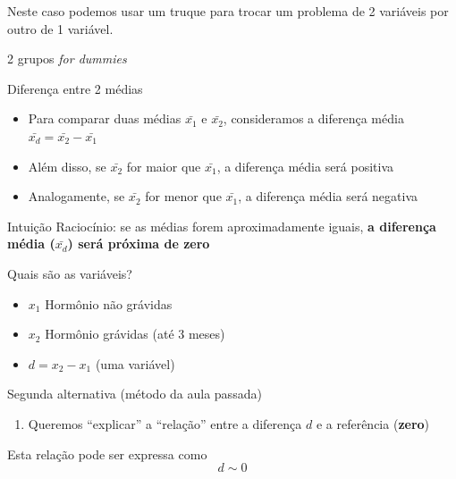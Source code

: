 \documentclass{beamer}
\begin{document}
\begin{frame}{}
  \begin{block}{}
    \large
    Neste caso podemos usar um truque para trocar um problema de 2 variáveis por outro de 1 variável.
  \end{block}
\end{frame}

\begin{frame}{2 grupos {\em for dummies}}
  \begin{block}{Diferença entre 2 médias}
    \begin{itemize}
    \item Para comparar duas médias $\bar{x_1}$ e $\bar{x_2}$, consideramos a diferença média $\bar{x_d} = \bar{x_2} - \bar{x_1}$
    \item Além disso, se $\bar{x_2}$ for maior que $\bar{x_1}$, a diferença média será positiva
    \item Analogamente, se $\bar{x_2}$ for menor que $\bar{x_1}$, a diferença média será negativa
    \end{itemize}
  \end{block}
  \begin{block}{Intuição}
    Raciocínio: se as médias forem aproximadamente iguais, {\bf a
    diferença média ($\bar{x_d}$) será próxima de zero}
  \end{block}
\end{frame}

\begin{frame}{Quais são as variáveis?}
  \begin{itemize}
  \item $x_1$ Hormônio não grávidas
  \item $x_2$ Hormônio grávidas (até 3 meses)
  \item $d = x_2 - x _1$ (uma variável)
  \end{itemize}
  \begin{block}{Segunda alternativa (método da aula passada)}
    \begin{enumerate}
    \item Queremos ``explicar'' a ``relação'' entre a diferença $d$ e a referência ({\bf zero})
    \end{enumerate}
  \end{block}
  \begin{block}{Esta relação pode ser expressa como}
    \begin{displaymath}
      d \sim 0
    \end{displaymath}
  \end{block}
\end{frame}
\end{document}
